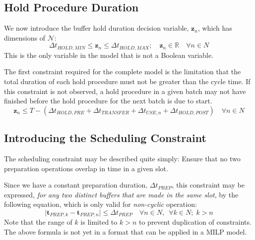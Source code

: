 \subsection{Hold Procedure Duration}\label{SS.constr5}

We now introduce the buffer hold duration decision variable, 
$\boldsymbol{z}_{n}$, which has dimensions of $\mathcal{N}$:
\begin{equation}
    \Delta t_{\mathit{HOLD,MIN}} \le \boldsymbol{z}_{n} \le 
    \Delta t_{\mathit{HOLD,MAX}}; \quad
    \boldsymbol{z}_{n} \in \mathbb{R} \quad \forall n \in N
    \label{eq.z}
\end{equation}
This is the only variable in the model that is not a Boolean variable.

The first constraint required for the complete model is the limitation that the
total duration of each hold procedure must not be greater than the cycle time.
If this constraint is not observed, a hold procedure in a given batch may not
have finished before the hold procedure for the next batch is due to start.
\begin{equation}
    \boldsymbol{z}_{n} \le T - \left( \Delta t_{\mathit{HOLD,PRE}} +
    \Delta t_{\mathit{TRANSFER}} + \Delta t_{\mathit{USE},n} + \Delta
    t_{\mathit{HOLD,POST}} \right) \quad \forall n \in N
    \label{eq.constr5}
\end{equation}

\subsection{Introducing the Scheduling Constraint}\label{SS.schedintro}

The scheduling constraint may be described quite simply:
Ensure that no two preparation operations overlap in time in a given slot.

Since we have a constant preparation duration, 
$\Delta t_{\mathit{PREP}}$, this constraint may be expressed, 
\emph{for any two distinct buffers that are made in the same slot}, by the
following equation, which is only valid for \emph{non-cyclic} operation:
\begin{equation}
    \lvert \boldsymbol{t}_{\mathit{PREP},k} - \boldsymbol{t}_{\mathit{PREP},n}
    \rvert \le \Delta t_{\mathit{PREP}} \quad \forall n \in N, \enspace
    \forall k \in N; \; k > n
\end{equation}
Note that the range of $ k $ is limited to $ k > n $ to prevent duplication
of constraints.
The above formula is not yet in a format that can be applied in a MILP model.

